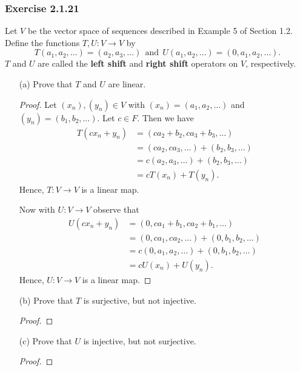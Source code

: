 \subsubsection{Exercise 2.1.21} Let \( V  \) be the vector space of sequences described in Example 5 of Section 1.2. Define the functions \( T,U : V \to V  \) by 
\[  T(a_{1}, a_{2}, \dots ) = (a_{2}, a_{3}, \dots ) \ \  \text{and} \ \ U(a_{1}, a_{2}, \dots ) = (0, a_{1}, a_{2}, \dots).  \]
\( T \) and \( U  \) are called the \textbf{left shift} and \textbf{right shift} operators on \( V  \), respectively. 
\begin{enumerate}
    \item[(a)] Prove that \( T  \) and \( U  \) are linear.
        \begin{proof}
        Let \( (x_{n}), (y_{n}) \in V  \) with \( (x_{n}) = (a_{1}, a_{2}, \dots ) \) and \( (y_{n}) = (b_{1}, b_{2}, \dots ) \). Let \( c \in F  \). Then we have 
        \begin{align*}
            T(cx_{n} + y_{n}) &= (ca_{2} + b_{2}, ca_{3} + b_{3}, \dots ) \\
                              &= (ca_{2}, ca_{3}, \dots ) + (b_{2},  b_{3}, \dots ) \\
                              &= c(a_{2}, a_{3}, \dots ) + (b_{2}, b_{3}, \dots) \\
                              &= c T(x_{n}) + T(y_{n}).
        \end{align*}
        Hence, \( T: V \to V   \) is a linear map.

        Now with \( U: V \to V  \) observe that
        \begin{align*}
            U(cx_{n} + y_{n}) &= (0, ca_{1} + b_{1}, ca_{2} + b_{1}, \dots ) \\
                              &= (0, ca_{1}, ca_{2}, \dots) + (0, b_{1}, b_{2}, \dots) \\
                              &= c(0, a_{1}, a_{2}, \dots ) + (0, b_{1}, b_{2}, \dots ) \\ 
                              &= c U(x_{n}) + U(y_{n}).
        \end{align*}
        Hence, \( U: V \to V   \) is a linear map.
        \end{proof}
    \item[(b)] Prove that \( T \) is surjective, but not injective.
        \begin{proof}
        
        \end{proof}
    \item[(c)] Prove that \( U  \) is injective, but not surjective.
        \begin{proof}
        
        \end{proof}
\end{enumerate}
